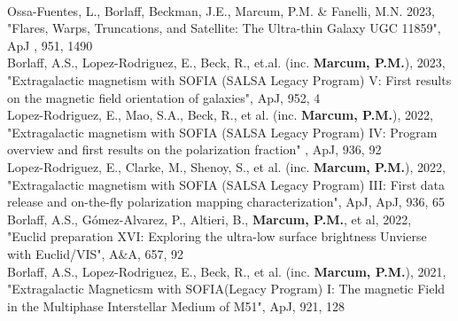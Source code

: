 {%
\SectionSpacing
{}\\
{\PubSym}Ossa-Fuentes, L., Borlaff, Beckman, J.E., Marcum, P.M. \& Fanelli, M.N. 2023, "Flares, Warps, Truncations, and Satellite: The Ultra-thin Galaxy UGC 11859", ApJ , 951, 1490\\ 
{\PubSym}Borlaff, A.S., Lopez-Rodriguez, E., Beck, R., et.al. (inc. \textbf{Marcum, P.M.}), 2023, "Extragalactic magnetism with SOFIA (SALSA Legacy Program) V: First results on the magnetic field orientation of galaxies", ApJ, 952, 4\\ 
{\PubSym}Lopez-Rodriguez, E., Mao, S.A., Beck, R., et al. (inc. \textbf{Marcum, P.M.}), 2022, "Extragalactic magnetism with SOFIA (SALSA Legacy Program) IV: Program overview and first results on the polarization fraction" , ApJ, 936, 92\\ 
{\PubSym}Lopez-Rodriguez, E., Clarke, M., Shenoy, S., et al. (inc. \textbf{Marcum, P.M.}), 2022, "Extragalactic magnetism with SOFIA (SALSA Legacy Program) III: First data release and on-the-fly polarization mapping characterization", ApJ, ApJ, 936, 65\\ 
{\PubSym}Borlaff, A.S., G{\'o}mez-Alvarez, P., Altieri, B., \textbf{Marcum, P.M.}, et al, 2022, "Euclid preparation XVI: Exploring the ultra-low surface brightness Unvierse with Euclid/VIS", A\&A, 657, 92\\ 
{\PubSym}Borlaff, A.S., Lopez-Rodriguez, E., Beck, R., et al. (inc. \textbf{Marcum, P.M.}), 2021, "Extragalactic Magneticsm with SOFIA(Legacy Program) I: The magnetic Field in the Multiphase Interstellar Medium of M51", ApJ, 921, 128
}
{%
}
